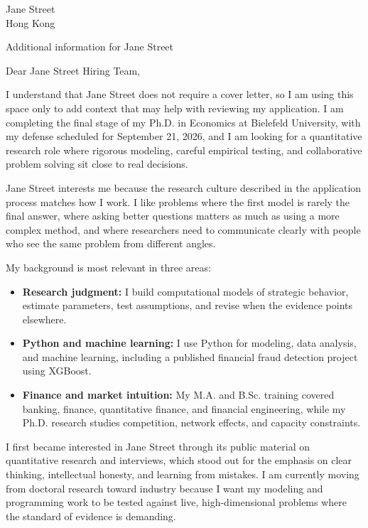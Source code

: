 \documentclass[11pt]{article}
\begin{document}
\vspace{0.1cm}

\noindent
Jane Street \\
Hong Kong

\vspace{0.1cm}

\noindent
Additional information for Jane Street \\

\vspace{0.05cm}

\noindent Dear Jane Street Hiring Team,

I understand that Jane Street does not require a cover letter, so I am using this space only to add context that may help with reviewing my application. 
I am completing the final stage of my Ph.D. in Economics at Bielefeld University, with my defense scheduled for September 21, 2026, 
and I am looking for a quantitative research role where rigorous modeling, careful empirical testing, and collaborative problem solving sit close to real decisions.

Jane Street interests me because the research culture described in the application process matches how I work. 
I like problems where the first model is rarely the final answer, where asking better questions matters as much as using a more complex method, 
and where researchers need to communicate clearly with people who see the same problem from different angles.

My background is most relevant in three areas:

\begin{itemize}
    \item \textbf{Research judgment:} I build computational models of strategic behavior, estimate parameters, test assumptions, and revise when the evidence points elsewhere.
    \item \textbf{Python and machine learning:} I use Python for modeling, data analysis, and machine learning, including a published financial fraud detection project using XGBoost.
    \item \textbf{Finance and market intuition:} My M.A. and B.Sc. training covered banking, finance, quantitative finance, and financial engineering, while my Ph.D. research studies competition, network effects, and capacity constraints.
\end{itemize}

I first became interested in Jane Street through its public material on quantitative research and interviews, 
which stood out for the emphasis on clear thinking, intellectual honesty, and learning from mistakes. 
I am currently moving from doctoral research toward industry because I want my modeling and programming work to be tested against live, high-dimensional problems where the standard of evidence is demanding.
\end{document}
